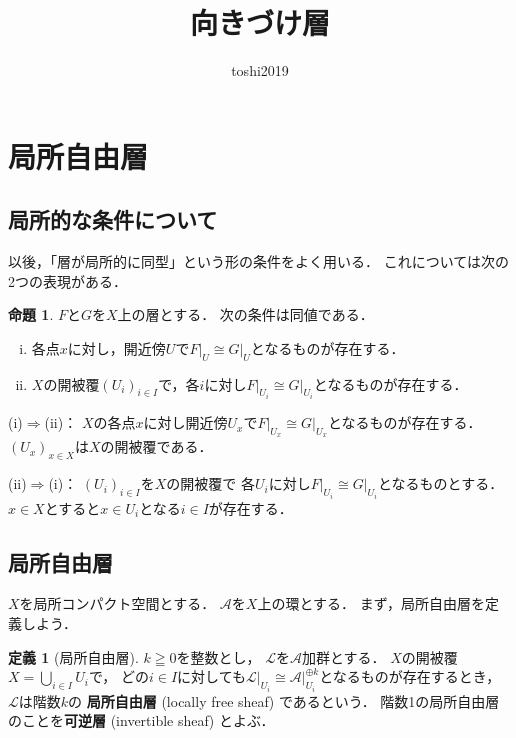 \documentclass[uplatex,dvipdfmx,a4paper,10pt]{jsarticle}
\title{向きづけ層}
\author{toshi2019}
\makeatletter
\theoremstyle{definition}
\newcommand{\mcal}{\mathcal}
\renewenvironment{proof}[1][\proofname]{\par
  \pushQED{\qed}%
  \normalfont \topsep6\p@\@plus6\p@\relax
  \trivlist
  \item[\hskip\labelsep
         \bfseries
    {#1}]\ignorespaces
}{%
  \popQED\endtrivlist\@endpefalse
}
\renewcommand{\proofname}{証明.}
\numberwithin{equation}{section}
\newcommand{\cA}{\mcal{A}}
\newcommand{\cL}{\mcal{L}}
\newcommand{\mres}[2][]{{\left.{#1}\right\rvert}_{#2}}
\theoremstyle{mystyle}
\newtheorem{mydfn}[mythm]{定義}
\newtheorem{myprp}[mythm]{命題}
\newenvironment{dfn}{\begin{dfnbox}\begin{mydfn}}{\end{mydfn}\end{dfnbox}}
\newenvironment{prp}{\begin{prpbox}\begin{myprp}}{\end{myprp}\end{prpbox}}
\makeatother
\begin{document}
\maketitle

\section{局所自由層}
\subsection{局所的な条件について}\label{ssec:locality}

以後，「層が局所的に同型」という形の条件をよく用いる．
これについては次の2つの表現がある．
\begin{prp}
    \(F\)と\(G\)を\(X\)上の層とする．
    次の条件は同値である．
    \begin{enumerate}[(i)]
        \item 各点\(x\)に対し，開近傍\(U\)で\(\mres[F]{U}\cong\mres[G]{U}\)となるものが存在する．
        \item \(X\)の開被覆\((U_i)_{i\in I}\)で，各\(i\)に対し\(\mres[F]{U_{i}}\cong\mres[G]{U_{i}}\)となるものが存在する．
    \end{enumerate}
\end{prp}
\begin{proof}
    (i)\(\Rightarrow\)(ii)：
    \(X\)の各点\(x\)に対し開近傍\(U_x\)で\(
        \mres[F]{U_{x}}\cong\mres[G]{U_{x}}
    \)となるものが存在する．
    \((U_x)_{x\in X}\)は\(X\)の開被覆である．

    (ii)\(\Rightarrow\)(i)：
    \((U_i)_{i\in I}\)を\(X\)の開被覆で
    各\(U_i\)に対し\(\mres[F]{U_{i}}\cong\mres[G]{U_{i}}\)となるものとする．
    \(x\in X\)とすると\(x\in U_{i}\)となる\(i\in I\)が存在する．
\end{proof}
\subsection{局所自由層}
\(X\)を局所コンパクト空間とする．
\(\cA\)を\(X\)上の環とする．
まず，局所自由層を定義しよう．
\begin{dfn}[局所自由層]
    \(k\geqq 0\)を整数とし，
    \(\cL\)を\(\cA\)加群とする．
    \(X\)の開被覆\(X=\bigcup_{i\in I}U_i\)で，
    どの\(i\in I\)に対しても\(
        \mres[\cL]{U_{i}}
        \cong 
        \mres[\cA]{U_{i}}^{\oplus k}
    \)となるものが存在するとき，
    \(\cL\)は階数\(k\)の
    \textbf{局所自由層} (locally free sheaf) であるという．
    階数1の局所自由層のことを\textbf{可逆層} (invertible sheaf) とよぶ．
\end{dfn}
\end{document}
